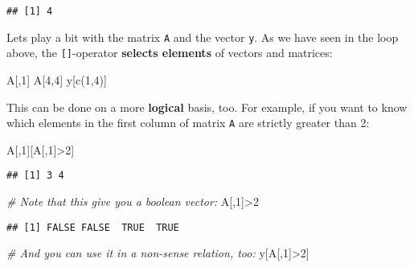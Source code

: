 \documentclass[
]{book}
\newenvironment{Shaded}{\begin{snugshade}}{\end{snugshade}}
\newcommand{\CommentTok}[1]{\textcolor[rgb]{0.56,0.35,0.01}{\textit{#1}}}
\newcommand{\DecValTok}[1]{\textcolor[rgb]{0.00,0.00,0.81}{#1}}
\newcommand{\FunctionTok}[1]{\textcolor[rgb]{0.00,0.00,0.00}{#1}}
\newcommand{\NormalTok}[1]{#1}
\newcommand{\SpecialCharTok}[1]{\textcolor[rgb]{0.00,0.00,0.00}{#1}}
\begin{document}
\begin{verbatim}
## [1] 4
\end{verbatim}

Lets play a bit with the matrix \texttt{A} and the vector \texttt{y}. As we have seen in the loop above, the \texttt{{[}{]}}-operator \textbf{selects elements} of vectors and matrices:

\begin{Shaded}
\begin{Highlighting}[]
\NormalTok{A[,}\DecValTok{1}\NormalTok{]}
\NormalTok{A[}\DecValTok{4}\NormalTok{,}\DecValTok{4}\NormalTok{]}
\NormalTok{y[}\FunctionTok{c}\NormalTok{(}\DecValTok{1}\NormalTok{,}\DecValTok{4}\NormalTok{)]}
\end{Highlighting}
\end{Shaded}

This can be done on a more \textbf{logical} basis, too. For example, if you want to know which elements in the first column of matrix \texttt{A} are strictly greater than 2:

\begin{Shaded}
\begin{Highlighting}[]
\NormalTok{A[,}\DecValTok{1}\NormalTok{][A[,}\DecValTok{1}\NormalTok{]}\SpecialCharTok{\textgreater{}}\DecValTok{2}\NormalTok{]}
\end{Highlighting}
\end{Shaded}

\begin{verbatim}
## [1] 3 4
\end{verbatim}

\begin{Shaded}
\begin{Highlighting}[]
\CommentTok{\# Note that this give you a boolean vector:}
\NormalTok{A[,}\DecValTok{1}\NormalTok{]}\SpecialCharTok{\textgreater{}}\DecValTok{2}
\end{Highlighting}
\end{Shaded}

\begin{verbatim}
## [1] FALSE FALSE  TRUE  TRUE
\end{verbatim}

\begin{Shaded}
\begin{Highlighting}[]
\CommentTok{\# And you can use it in a non{-}sense relation, too:}
\NormalTok{y[A[,}\DecValTok{1}\NormalTok{]}\SpecialCharTok{\textgreater{}}\DecValTok{2}\NormalTok{]}
\end{Highlighting}
\end{Shaded}
\end{document}
